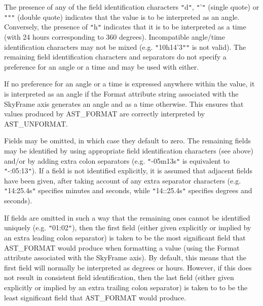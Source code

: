 \documentclass[twoside,11pt]{article}
\begin{document}
{{{         \sstitem
         The presence of any of the field identification characters
         {\tt{"}}d{\tt{"}}, {\tt{"}}'{\tt{"}} (single quote) or {\tt{"}}{\tt{"}}{\tt{"}} (double quote) indicates that the
         value is to be interpreted as an angle. Conversely, the presence
         of {\tt{"}}h{\tt{"}} indicates that it is to be interpreted as a time (with 24
         hours corresponding to 360 degrees). Incompatible angle/time
         identification characters may not be mixed (e.g. {\tt{"}}10h14'3{\tt{"}}{\tt{"}} is
         not valid).  The remaining field identification characters and
         separators do not specify a preference for an angle or a time
         and may be used with either.

         \sstitem
         If no preference for an angle or a time is expressed anywhere
         within the value, it is interpreted as an angle if the Format
         attribute string associated with the SkyFrame axis generates an
         angle and as a time otherwise. This ensures that values produced
         by AST\_FORMAT are correctly interpreted by AST\_UNFORMAT.

         \sstitem
         Fields may be omitted, in which case they default to zero. The
         remaining fields may be identified by using appropriate field
         identification characters (see above) and/or by adding extra
         colon separators (e.g. {\tt{"}}-05m13s{\tt{"}} is equivalent to {\tt{"}}-:05:13{\tt{"}}). If
         a field is not identified explicitly, it is assumed that
         adjacent fields have been given, after taking account of any
         extra separator characters (e.g. {\tt{"}}14:25.4s{\tt{"}} specifies minutes
         and seconds, while {\tt{"}}14::25.4s{\tt{"}} specifies degrees and seconds).

         \sstitem
         If fields are omitted in such a way that the remaining ones
         cannot be identified uniquely (e.g. {\tt{"}}01:02{\tt{"}}), then the first
         field (either given explicitly or implied by an extra leading
         colon separator) is taken to be the most significant field that
         AST\_FORMAT would produce when formatting a value (using the
         Format attribute associated with the SkyFrame axis).  By
         default, this means that the first field will normally be
         interpreted as degrees or hours. However, if this does not
         result in consistent field identification, then the last field
         (either given explicitly or implied by an extra trailing colon
         separator) is taken to to be the least significant field that
         AST\_FORMAT would produce.

}}}
\end{document}
